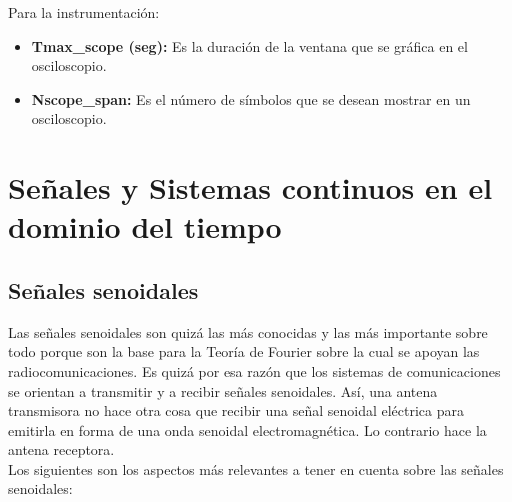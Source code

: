 Para la instrumentación:

\begin{itemize}
	\item  \textbf{Tmax\_scope (seg):} Es la duración de la ventana que se gráfica en el osciloscopio.
	\item  \textbf{Nscope\_span:} Es el número de símbolos que se desean mostrar en un osciloscopio.
\end{itemize}

\section{Señales y Sistemas continuos en el dominio del tiempo}

\subsection{Señales senoidales}

Las señales senoidales son quizá las más conocidas y las más importante sobre todo porque son la base para la Teoría de Fourier sobre la cual se apoyan las radiocomunicaciones. Es quizá por esa razón que los sistemas de comunicaciones se orientan a transmitir y a recibir señales senoidales. Así, una antena transmisora no hace otra cosa que recibir una señal senoidal eléctrica para emitirla en forma de una onda senoidal electromagnética. Lo contrario hace la antena receptora.\\

Los siguientes son los aspectos más relevantes a tener en cuenta sobre las señales senoidales:

